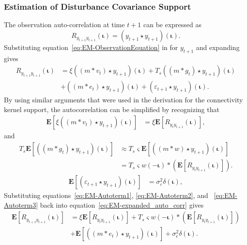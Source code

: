 \documentclass[]{article}
\begin{document}
\subsubsection{Estimation of Disturbance Covariance Support}
The observation auto-correlation at time $t+1$ can be expressed as
\begin{equation}
	R_{y_{t+1}y_{t+1}}(\boldsymbol{\iota})=(y_{t+1} \star y_{t+1})(\boldsymbol\iota).
\end{equation}
Substituting equation~\eqref{eq:EM-ObservationEquation} in for $y_{t+1}$ and expanding gives
\begin{align}\label{eq:EM-expanded_auto_corr}
	R_{y_{t+1}y_{t+1}}(\boldsymbol{\iota}) &= \xi((m \ast v_{t}) \star y_{t+1})(\boldsymbol{\iota}) +T_s((m\ast g_{t})\star y_{t+1})(\boldsymbol{\iota}) \nonumber \\
	&+((m\ast e_{t})\star  y_{t+1})(\boldsymbol{\iota})+(\varepsilon_{t+1} \star y_{t+1})(\boldsymbol{\iota}).
\end{align}
By using similar arguments that were used in the derivation for the connectivity kernel support, the autocorrelation can be simplified by recognizing that
\begin{align}\label{eq:EM-Autoterm1}
  \mathbf{E}[\xi((m\ast v_{t})\star y_{t+1})(\boldsymbol{\iota})]&=\xi \mathbf{E}[ R_{y_ty_{t+1}}(\boldsymbol{\iota})],
\end{align}
and
\begin{align}\label{eq:EM-Autoterm2}
	T_s\mathbf{E}[((m\ast g_t) \star y_{t+1})(\boldsymbol\iota)] &\approx T_s\varsigma\mathbf{E}[((m \ast w )\star y_{t+1})(\boldsymbol\iota)] \nonumber\\
	&= T_s\varsigma w(-\boldsymbol\iota) \ast (\mathbf{E}\left[R_{y_ty_{t+1}}(\boldsymbol\iota)\right] ).
\end{align}
\begin{align}\label{eq:EM-Autoterm3}
 \mathbf{E}[(\varepsilon_{t+1}\star y_{t+1})(\boldsymbol\iota)]&=\sigma_{\varepsilon}^2\delta(\boldsymbol{\iota}),
\end{align}
Substituting equations~\eqref{eq:EM-Autoterm1}, \eqref{eq:EM-Autoterm2}, and ~\eqref{eq:EM-Autoterm3} back into equation~\eqref{eq:EM-expanded_auto_corr} gives
\begin{align}\label{eq:EM-Auto&CrossNoisy}
	\mathbf{E}[R_{y_{t+1}y_{t+1}}(\boldsymbol{\iota})] &= \xi \mathbf{E}[R_{y_ty_{t+1}}(\boldsymbol{\iota})]+T_s\varsigma w(-\boldsymbol\iota) \ast (\mathbf{E}\left[R_{y_ty_{t+1}}(\boldsymbol\iota)\right] ) \nonumber \\
	&+\mathbf{E}[((m\ast e_t)\star y_{t+1})(\boldsymbol\iota)] +\sigma_{\epsilon}^2\delta(\boldsymbol{\iota}).
\end{align}
\end{document}
